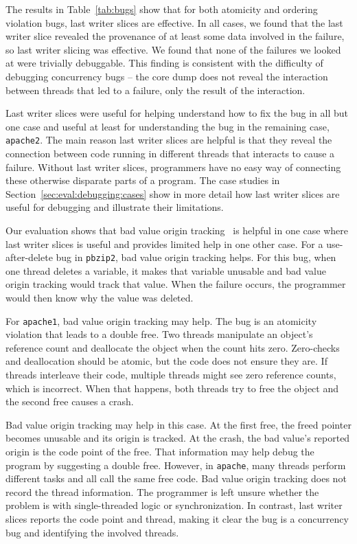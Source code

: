 \documentclass[preprint,9pt]{sigplanconf}
\begin{document}
The results in Table~\ref{tab:bugs} show that for both atomicity and ordering
violation bugs, last writer slices are effective.  In all cases, we found that
the last writer slice revealed the provenance of at least some data involved in
the failure, so last writer slicing was effective.  We found that none of the
failures we looked at were trivially debuggable.  This finding is consistent
with the difficulty of debugging concurrency bugs -- the core dump does not
reveal the interaction between threads that led to a failure, only the result
of the interaction.  

Last writer slices were useful for helping understand how to fix the bug in
all but one case and useful at least for understanding the bug in the
remaining case, {\tt apache2}.  The main reason last writer slices are helpful
is that they reveal the connection between code running in different threads
that interacts to cause a failure.  Without last writer slices, programmers
have no easy way of connecting these otherwise disparate parts of a program.
The case studies in Section~\ref{sec:eval:debugging:cases} show in more detail
how last writer slices are useful for debugging and illustrate their limitations.


Our evaluation shows that bad value origin tracking~\cite{badapples} is
helpful in one case where last writer slices is useful and provides limited help
in one other case.  For a use-after-delete bug in {\tt pbzip2}, bad value
origin tracking helps.  For this bug, when one thread deletes a variable, it
makes that variable unusable and bad value origin tracking would track that
value.  When the failure occurs, the programmer would then know why the value
was deleted.  

For {\tt apache1}, bad value origin tracking may help.  The bug is an atomicity
violation that leads to a double free.  Two threads manipulate an object's
reference count and deallocate the object when the count hits zero. Zero-checks
and deallocation should be atomic, but the code does not ensure they are.  If
threads interleave their code, multiple threads might see zero reference
counts, which is incorrect.  When that happens, both threads try to free the
object and the second free causes a crash.  

Bad value origin tracking may help in this case.  At the first free, the freed
pointer becomes unusable and its origin is tracked.  At the crash, the bad
value's reported origin is the code point of the free. That information may
help debug the program by suggesting a double free.  However, in {\tt apache},
many threads perform different tasks and all call the same free code.  Bad
value origin tracking does not record the thread information.  The programmer
is left unsure whether the problem is with single-threaded logic or
synchronization.  In contrast, last writer slices reports the code point and
thread, making it clear the bug is a concurrency bug and identifying the
involved threads.
\end{document}
